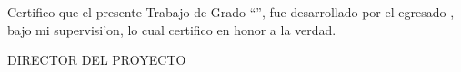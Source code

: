 \vspace{1.5cm}

Certifico que el presente Trabajo de Grado ``\inserttitle'', fue desarrollado por el egresado \insertauthor, bajo mi supervisi'on, lo cual certifico en honor a la verdad. 

\vspace{8.5cm}

\begin{center}
\insertsupervisor
\end{center}
\begin{center}
DIRECTOR DEL PROYECTO
\end{center}